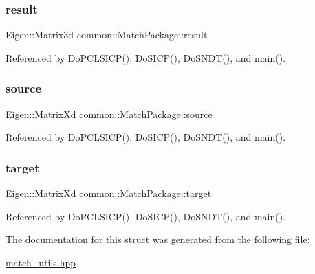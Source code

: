 \subsubsection{\texorpdfstring{result}{result}}
{\footnotesize\ttfamily Eigen\+::\+Matrix3d common\+::\+Match\+Package\+::result}



Referenced by Do\+P\+C\+L\+S\+I\+C\+P(), Do\+S\+I\+C\+P(), Do\+S\+N\+D\+T(), and main().

\mbox{\label{structcommon_1_1MatchPackage_a1eafbc6a1740dde4ab7adf0e55728880}} 
\subsubsection{\texorpdfstring{source}{source}}
{\footnotesize\ttfamily Eigen\+::\+Matrix\+Xd common\+::\+Match\+Package\+::source}



Referenced by Do\+P\+C\+L\+S\+I\+C\+P(), Do\+S\+I\+C\+P(), Do\+S\+N\+D\+T(), and main().

\mbox{\label{structcommon_1_1MatchPackage_a99634972d12f9a982c16c0adc1fe18b2}} 
\subsubsection{\texorpdfstring{target}{target}}
{\footnotesize\ttfamily Eigen\+::\+Matrix\+Xd common\+::\+Match\+Package\+::target}



Referenced by Do\+P\+C\+L\+S\+I\+C\+P(), Do\+S\+I\+C\+P(), Do\+S\+N\+D\+T(), and main().



The documentation for this struct was generated from the following file\+:\begin{DoxyCompactItemize}
\item 
\hyperlink{match__utils_8hpp}{match\+\_\+utils.\+hpp}\end{DoxyCompactItemize}
